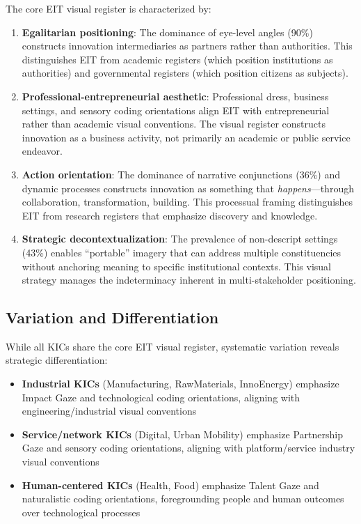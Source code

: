 \documentclass[../main.tex]{subfiles}
\begin{document}
The core EIT visual register is characterized by:

\begin{enumerate}
    \item \textbf{Egalitarian positioning}: The dominance of eye-level angles (90\%) constructs innovation intermediaries as partners rather than authorities. This distinguishes EIT from academic registers (which position institutions as authorities) and governmental registers (which position citizens as subjects).

    \item \textbf{Professional-entrepreneurial aesthetic}: Professional dress, business settings, and sensory coding orientations align EIT with entrepreneurial rather than academic visual conventions. The visual register constructs innovation as a business activity, not primarily an academic or public service endeavor.

    \item \textbf{Action orientation}: The dominance of narrative conjunctions (36\%) and dynamic processes constructs innovation as something that \textit{happens}---through collaboration, transformation, building. This processual framing distinguishes EIT from research registers that emphasize discovery and knowledge.

    \item \textbf{Strategic decontextualization}: The prevalence of non-descript settings (43\%) enables ``portable'' imagery that can address multiple constituencies without anchoring meaning to specific institutional contexts. This visual strategy manages the indeterminacy inherent in multi-stakeholder positioning.
\end{enumerate}

\subsection{Variation and Differentiation}

While all KICs share the core EIT visual register, systematic variation reveals strategic differentiation:

\begin{itemize}
    \item \textbf{Industrial KICs} (Manufacturing, RawMaterials, InnoEnergy) emphasize Impact Gaze and technological coding orientations, aligning with engineering/industrial visual conventions

    \item \textbf{Service/network KICs} (Digital, Urban Mobility) emphasize Partnership Gaze and sensory coding orientations, aligning with platform/service industry visual conventions

    \item \textbf{Human-centered KICs} (Health, Food) emphasize Talent Gaze and naturalistic coding orientations, foregrounding people and human outcomes over technological processes
\end{itemize}
\end{document}
